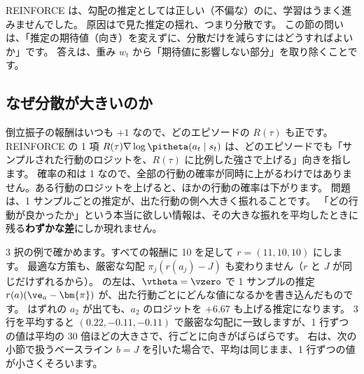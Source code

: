 REINFORCE は、勾配の推定としては正しい（不偏な）のに、学習はうまく進みませんでした。
原因はで見た推定の揺れ、つまり分散です。
この節の問いは、「推定の期待値（向き）を変えずに、分散だけを減らすにはどうすればよいか」です。
答えは、重み $w_t$ から「期待値に影響しない部分」を取り除くことです。

\subsection*{なぜ分散が大きいのか}

倒立振子の報酬はいつも $+1$ なので、どのエピソードの $R(\tau)$ も正です。
REINFORCE の 1 項 $R(\tau)\nabla\log\pitheta(a_t\mid s_t)$ は、どのエピソードでも「サンプルされた行動のロジットを、$R(\tau)$ に比例した強さで上げる」向きを指します。
確率の和は 1 なので、全部の行動の確率が同時に上がるわけではありません。ある行動のロジットを上げると、ほかの行動の確率は下がります。
問題は、1 サンプルごとの推定が、出た行動の側へ大きく振れることです。
「どの行動が良かったか」という本当に欲しい情報は、その大きな振れを平均したときに残る\textbf{わずかな差}にしか現れません。

3 択の例で確かめます。すべての報酬に 10 を足して $r=(11,10,10)$ にします。
最適な方策も、厳密な勾配 $\pi_j(r(a_j)-J)$ も変わりません（$r$ と $J$ が同じだけずれるから）。
の左は、$\vtheta=\vzero$ で 1 サンプルの推定 $r(a)(\ve_a-\bm{\pi})$ が、出た行動ごとにどんな値になるかを書き込んだものです。
はずれの $a_2$ が出ても、$a_2$ のロジットを $+6.67$ も上げる推定になります。
3 行を平均すると $(0.22,-0.11,-0.11)$ で厳密な勾配に一致しますが、1 行ずつの値は平均の 30 倍ほどの大きさで、行ごとに向きがばらばらです。
右は、次の小節で扱うベースライン $b=J$ を引いた場合で、平均は同じまま、1 行ずつの値が小さくそろいます。

